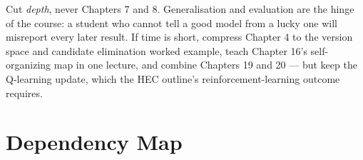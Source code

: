 \begin{alertbox}
Cut \emph{depth}, never Chapters 7 and 8. Generalisation and evaluation are the hinge
of the course: a student who cannot tell a good model from a lucky one will misreport
every later result. If time is short, compress Chapter 4 to the version space and
candidate elimination worked example, teach Chapter 16's self-organizing map in one
lecture, and combine Chapters 19 and 20 --- but keep the Q-learning update, which the
HEC outline's reinforcement-learning outcome requires.
\end{alertbox}

\section{Dependency Map}


